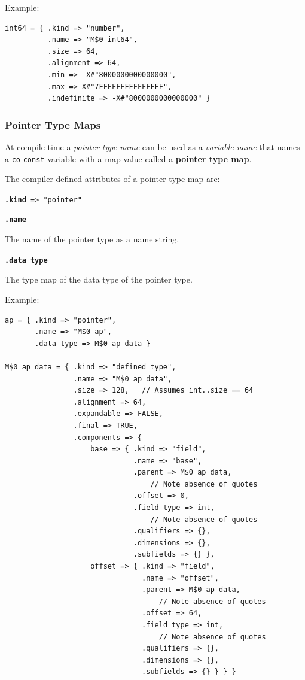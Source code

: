 \documentclass[12pt]{article}
\newcommand{\key}[1]{{\rm \bfseries #1}}
\newcommand{\ttkey}[1]{{\tt \bfseries #1}}
\newenvironment{indpar}[1][0.3in]%
	{\begin{list}{}%
		     {\setlength{\itemsep}{0in}%
		      \setlength{\topsep}{0in}%
		      \setlength{\parsep}{1ex}%
		      \setlength{\labelwidth}{#1}%
		      \setlength{\leftmargin}{#1}%
		      \addtolength{\leftmargin}{\labelsep}}%
	 \item}%
	{\end{list}}
\begin{document}
Example:
\begin{indpar}\begin{verbatim}
int64 = { .kind => "number",
          .name => "M$0 int64",
          .size => 64,
          .alignment => 64,
          .min => -X#"8000000000000000",
          .max => X#"7FFFFFFFFFFFFFFF",
          .indefinite => -X#"8000000000000000" }
\end{verbatim}\end{indpar}

\subsubsection{Pointer Type Maps}
\label{POINTER-TYPE-MAPS}

At compile-time a {\em pointer-type-name} can be used as a
{\em variable-name} that names a {\tt co} {\tt const} variable
with a map value called a \key{pointer type map}.

The compiler defined attributes of a pointer type map are:

{\tt \ttkey{.kind} => "pointer"}

\ttkey{.name}
\begin{indpar}
The name of the pointer type as a name string.
\end{indpar}

\ttkey{.data type}
\begin{indpar}
The type map of the data type of the pointer type.
\end{indpar}

Example:
\begin{indpar}\begin{verbatim}
ap = { .kind => "pointer",
       .name => "M$0 ap",
       .data type => M$0 ap data }

M$0 ap data = { .kind => "defined type",
                .name => "M$0 ap data",
                .size => 128,   // Assumes int..size == 64
                .alignment => 64,
                .expandable => FALSE,
                .final => TRUE,
                .components => {
                    base => { .kind => "field",
                              .name => "base",
                              .parent => M$0 ap data,
                                  // Note absence of quotes
                              .offset => 0,
                              .field type => int,
                                  // Note absence of quotes
                              .qualifiers => {},
                              .dimensions => {},
                              .subfields => {} },
                    offset => { .kind => "field",
                                .name => "offset",
                                .parent => M$0 ap data,
                                    // Note absence of quotes
                                .offset => 64,
                                .field type => int,
                                    // Note absence of quotes
                                .qualifiers => {},
                                .dimensions => {},
                                .subfields => {} } } }

\end{verbatim}\end{indpar}
\end{document}
